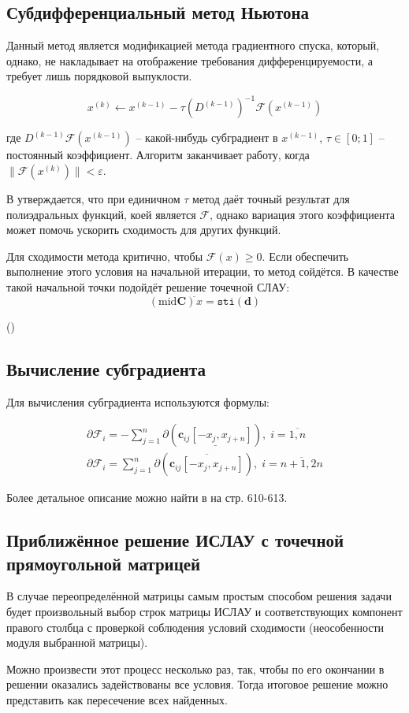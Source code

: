 \subsection{Субдифференциальный метод Ньютона}

Данный метод является модификацией метода градиентного спуска, который, однако, не накладывает на отображение требования дифференцируемости, а требует лишь порядковой выпуклости.

\begin{equation*}
	x^{(k)} \leftarrow x^{(k - 1)} - \tau(D^{(k - 1)})^{-1}\mathcal{F}(x^{(k - 1)})
\end{equation*}

где $D^{(k - 1)}\mathcal{F}(x^{(k - 1)})$ -- какой-нибудь субградиент в $x^{(k - 1)}$, $\tau \in [0; 1]$ -- постоянный коэффициент. Алгоритм заканчивает работу, когда $\| \mathcal{F}(x^{(k)}) \| < \varepsilon$.

В \cite{shary} утверждается, что при единичном $\tau$ метод даёт точный результат для полиэдральных функций, коей является $\mathcal{F}$, однако вариация этого коэффициента может помочь ускорить сходимость для других функций.

Для сходимости метода критично, чтобы $\mathcal{F}(x) \geq 0$. Если обеспечить выполнение этого условия на начальной итерации, то метод сойдётся. В качестве такой начальной точки подойдёт решение точечной СЛАУ:
\begin{equation}
(\textrm{mid} \mathbf{C})^{\tilde{}}x = \texttt{sti}(\mathbf{d})
\end{equation}

 (\cite[стр. 607]{shary})

\subsection{Вычисление субградиента}

Для вычисления субградиента используются формулы:

\begin{align}
\partial\mathcal{F}_i=-\sum_{j=1}^{n}\partial(\underline{\mathbf{c}_{ij}[-x_j, x_{j+n}]}), \;i = \overline{1,n} \\
\partial\mathcal{F}_i=\sum_{j=1}^{n}\partial(\overline{\mathbf{c}_{ij}[-x_j, x_{j+n}]}), \;i = \overline{n+1,2n}
\end{align}

Более детальное описание можно найти в \cite{shary} на стр. 610-613.

\subsection{Приближённое решение ИСЛАУ с точечной прямоугольной матрицей}

В случае переопределённой матрицы самым простым способом решения задачи будет произвольный выбор строк матрицы ИСЛАУ и соответствующих компонент правого столбца с проверкой соблюдения условий сходимости (неособенности модуля выбранной матрицы).

Можно произвести этот процесс несколько раз, так, чтобы по его окончании в решении оказались задействованы все условия. Тогда итоговое решение можно представить как пересечение всех найденных.